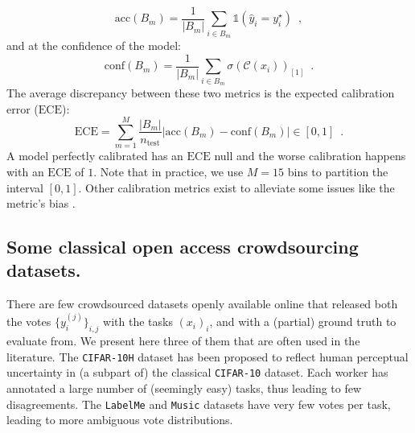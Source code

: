 \begin{itemize}
\begin{equation}
        \mathrm{acc}(B_m) = \frac{1}{|B_m|}\sum_{i\in B_m} \mathds{1}(\hat y_i = y_i^\star) \enspace,
    \end{equation}
    and at the confidence of the model:
    \begin{equation}\label{eq:confidenceBm}
        \mathrm{conf}(B_m) = \frac{1}{|B_m|}\sum_{i\in B_m} \sigma(\mathcal{C}(x_i))_{[1]} \enspace.
    \end{equation}
    The average discrepancy between these two metrics is the expected calibration error ($\mathrm{ECE}$):
    \begin{equation}\label{eq:ECE}
        \mathrm{ECE} = \sum_{m=1}^M \frac{|B_m|}{n_\text{test}} |\mathrm{acc}(B_m) - \mathrm{conf}(B_m)| \in [0,1] \enspace.
    \end{equation}
    A model perfectly calibrated has an $\mathrm{ECE}$ null and the worse calibration happens with an $\mathrm{ECE}$ of $1$.
    Note that in practice, we use $M=15$ bins to partition the interval $[0,1]$.
    Other calibration metrics exist \citep{kumar2019verified, KIM2020106677} to alleviate some issues like the metric's bias \citep{gruber2022better}.
\end{itemize}

\subsection{Some classical open access crowdsourcing datasets.}
\label{sub:classical-datasets}

There are few crowdsourced datasets openly available online that released both the votes $\{y_i^{(j)}\}_{i,j}$ with the tasks $(x_i)_i$, and with a (partial) ground truth to evaluate from.
We present here three of them that are often used in the literature.
The \texttt{CIFAR-10H} \citep{peterson_human_2019} dataset has been proposed to reflect human perceptual uncertainty in (a subpart of) the classical \texttt{CIFAR-10} dataset.
Each worker has annotated a large number of (seemingly easy) tasks, thus leading to few disagreements.
The \texttt{LabelMe} and \texttt{Music} datasets \citep{rodrigues2014gaussian, rodrigues2017learning} have very few votes per task, leading to more ambiguous vote distributions.

